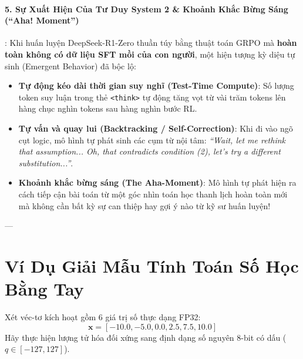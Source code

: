 \paragraph{5. Sự Xuất Hiện Của Tư Duy System 2 \& Khoảnh Khắc Bừng Sáng (``Aha! Moment'')}:
Khi huấn luyện DeepSeek-R1-Zero thuần túy bằng thuật toán GRPO mà \textbf{hoàn toàn không có dữ liệu SFT mồi của con người}, một hiện tượng kỳ diệu tự sinh (Emergent Behavior) đã bộc lộ:
\begin{itemize}
  \item \textbf{Tự động kéo dài thời gian suy nghĩ (Test-Time Compute)}: Số lượng token suy luận trong thẻ \verb|<think>| tự động tăng vọt từ vài trăm tokens lên hàng chục nghìn tokens sau hàng nghìn bước RL.
  \item \textbf{Tự vấn và quay lui (Backtracking / Self-Correction)}: Khi đi vào ngõ cụt logic, mô hình tự phát sinh các cụm từ nội tâm: \textit{``Wait, let me rethink that assumption... Oh, that contradicts condition (2), let's try a different substitution...''}.
  \item \textbf{Khoảnh khắc bừng sáng (The Aha-Moment)}: Mô hình tự phát hiện ra cách tiếp cận bài toán từ một góc nhìn toán học thanh lịch hoàn toàn mới mà không cần bất kỳ sự can thiệp hay gợi ý nào từ kỹ sư huấn luyện!
\end{itemize}

---

\section{Ví Dụ Giải Mẫu Tính Toán Số Học Bằng Tay}
\label{sec:worked-arithmetic-examples}

\begin{example}
Xét véc-tơ kích hoạt gồm 6 giá trị số thực dạng FP32:
\begin{equation*}
\mathbf{x} = [-10.0, -5.0, 0.0, 2.5, 7.5, 10.0]
\end{equation*}
Hãy thực hiện lượng tử hóa đối xứng sang định dạng số nguyên 8-bit có dấu ($q \in [-127, 127]$).
\end{example}

